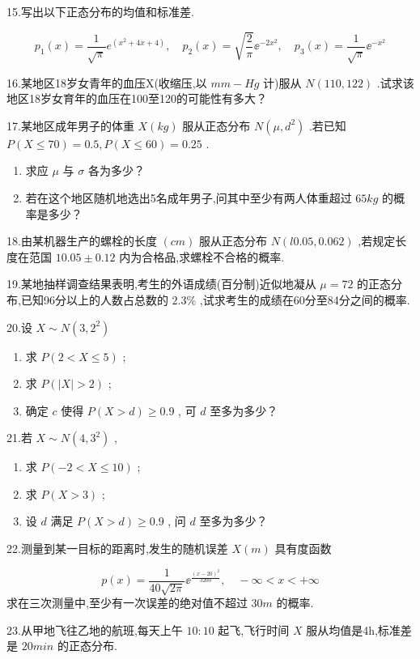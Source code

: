 15.写出以下正态分布的均值和标准差.

\[
p_{1}(x)=\frac{1}{\sqrt{\pi}} e^{\left(x^{2}+4 x+4\right)}, \quad p_{2}(x)=\sqrt{\frac{2}{\pi}} \ee ^{-2 x^{2}}, \quad p_{3}(x)=\frac{1}{\sqrt{\pi}} \ee ^{-x^{2}}
\]

16.某地区18岁女青年的血压X(收缩压,以 $ mm-Hg $ 计)服从 $ N(110,122) $ .试求该地区18岁女育年的血压在100至120的可能性有多大？

17.某地区成年男子的体重 $ X(kg) $ 服从正态分布 $ N\left(\mu, d^{2}\right) $ .若已知 $ P(X \leqslant 70)=0.5 , P(X \leqslant 60)=0.25 $ .
\begin{enumerate}
	\item 求应 $ \mu $ 与 $ \sigma $ 各为多少？
	\item 若在这个地区随机地选出5名成年男子,问其中至少有两人体重超过 $ 65kg $ 的概率是多少？
\end{enumerate}

18.由某机器生产的螺栓的长度 $ (cm) $ 服从正态分布 $ N(l0.05,0.062) $ ,若规定长度在范国 $ 10.05 \pm 0.12 $ 内为合格品,求螺栓不合格的概率.

19.某地抽样调查结果表明,考生的外语成绩(百分制)近似地凝从 $ \mu=72 $ 的正态分布,已知96分以上的人数占总数的 $ 2.3\% $ ,试求考生的成绩在60分至84分之间的概率.

20.设 $ X \sim N\left(3,2^{2}\right) $ 

\begin{enumerate}
	\item 求 $ P(2<X \leqslant 5) $ ;
	\item 求 $ P(|X|>2) $ ;
	\item 确定 $ c $ 使得 $ P(X>d) \geqslant 0.9 $ , 可 $ d $ 至多为多少？
\end{enumerate}

21.若 $ X \sim N\left(4,3^{2}\right) $ ,
\begin{enumerate}
	\item 求 $ P(-2<X \leqslant 10) $ ;
	\item 求 $ P(X>3) $ ;
	\item 设 $ d $ 满足 $ P(X>d)  \geqslant 0.9 $ , 问 $ d $ 至多为多少？
\end{enumerate}

22.测量到某一目标的距离时,发生的随机误差 $ X(m) $ 具有度函数

\[
p(x)=\frac{1}{40 \sqrt{2 \pi}} \ee ^{\frac{(x-20)^{2}}{3200}}, \quad-\infty<x<+\infty
\]
求在三次测量中,至少有一次误差的绝对值不超过 $ 30m $ 的概率.

23.从甲地飞往乙地的航班,每天上午 $ 10:10 $ 起飞,飞行时间 $ X $ 服从均值是4h,标准差是 $ 20min $ 的正态分布.

